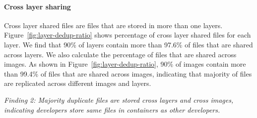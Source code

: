
\paragraph{Cross layer sharing}

Cross layer shared files are files that are stored in
more than one layers. 
% 
%
%
Figure~\ref{fig:layer-dedup-ratio} shows percentage of cross layer
shared files for each layer. We find that 90\% of layers contain more than 97.6\%
of files that are shared across layers. We also calculate the percentage of
files that are shared across images. As shown in
Figure~\ref{fig:layer-dedup-ratio}, 90\% of images contain more than 99.4\% of
files that are shared across images, indicating that majority of files are
replicated across different images and layers.

\textit{Finding 2: Majority duplicate files are stored cross layers and cross
images, indicating developers store same files in containers as other
developers.} 
%

